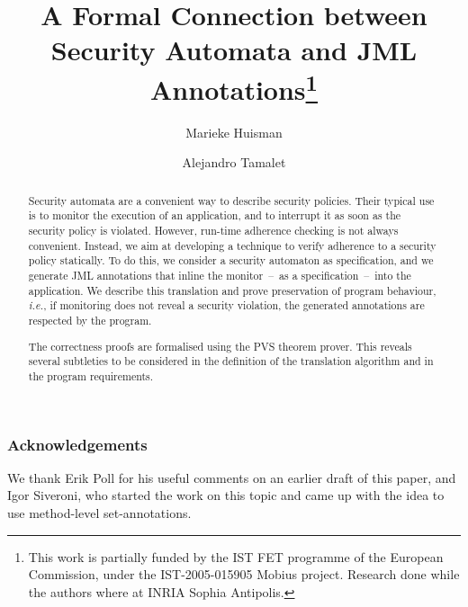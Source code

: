 \documentclass[]{llncs}
\title{A Formal Connection between Security Automata and JML
Annotations\thanks{This work is partially funded by the IST FET
programme of the European Commission, under the IST-2005-015905
\textsf{Mobius} project. Research done while the authors where at INRIA Sophia
Antipolis.}}
\author{Marieke Huisman\inst{1}
 \and Alejandro Tamalet\inst{2}}
\institute{University of Twente, Netherlands \and
University of Nijmegen, Netherlands}
\begin{document}
\maketitle
\begin{abstract}
Security automata are a convenient way to describe security
policies. Their typical use is to monitor the execution of an
application, and to interrupt it as soon as the security policy is
violated. However, run-time adherence checking is not always
convenient. Instead, we aim at developing a technique to verify
adherence to a security policy statically.  To do this, we consider
a security automaton as specification, and we generate JML
annotations that inline the monitor~--~as a specification~--~into the
application.  We describe this translation and prove preservation of
program behaviour, \emph{i.e.}, if monitoring does not reveal a
security violation, the generated annotations are respected by the
program.

The correctness proofs are formalised using the PVS theorem prover.
This reveals several subtleties to be considered in the definition of the
translation algorithm and in the program requirements.
\end{abstract}












\subsubsection*{Acknowledgements}
We thank Erik Poll for his useful comments on an earlier draft of this
paper, and Igor Siveroni, who started the work on this topic and came
up with the idea to use method-level set-annotations.
\end{document}
